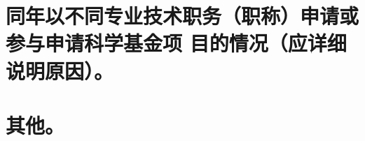 \documentclass[UTF8, punct, oneside, fontset=none]{ctexbook}
\begin{document}
\begin{MS}
	
\end{MS}

\section{同年以不同专业技术职务\kg{0.2em}（职称）\kg{0.2em}申请或参与申请科学基金项 目的情况（应详细说明原因）。}

\begin{MS}
	
\end{MS}

\section{其他。}

\begin{MS}
	
\end{MS}
\end{document}
